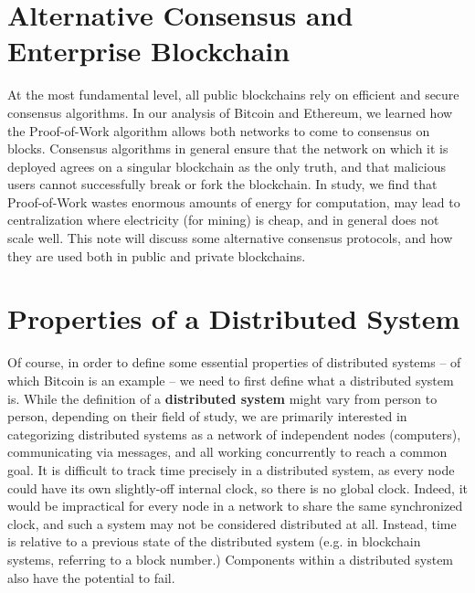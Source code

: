 \documentclass[full.tex]{subfiles}
\begin{document}
    \thispagestyle{firstpage}
    \vspace*{2\baselineskip}
    \section*{Alternative Consensus and Enterprise Blockchain}
    
    At the most fundamental level, all public blockchains rely on efficient and secure consensus algorithms. In our analysis of Bitcoin and Ethereum, we learned how the Proof-of-Work algorithm allows both networks to come to consensus on blocks. Consensus algorithms in general ensure that the network on which it is deployed agrees on a singular blockchain as the only truth, and that malicious users cannot successfully break or fork the blockchain. In study, we find that Proof-of-Work wastes enormous amounts of energy for computation, may lead to centralization where electricity (for mining) is cheap, and in general does not scale well. This note will discuss some alternative consensus protocols, and how they are used both in public and private blockchains.
    
    \section*{Properties of a Distributed System}
    
    Of course, in order to define some essential properties of distributed systems -- of which Bitcoin is an example -- we need to first define what a distributed system is. While the definition of a \textbf{distributed system} might vary from person to person, depending on their field of study, we are primarily interested in categorizing distributed systems as a network of independent nodes (computers), communicating via messages, and all working concurrently to reach a common goal. It is difficult to track time precisely in a distributed system, as every node could have its own slightly-off internal clock, so there is no global clock. Indeed, it would be impractical for every node in a network to share the same synchronized clock, and such a system may not be considered distributed at all. Instead, time is relative to a previous state of the distributed system (e.g. in blockchain systems, referring to a block number.) Components within a distributed system also have the potential to fail. 
    
    
\end{document}
